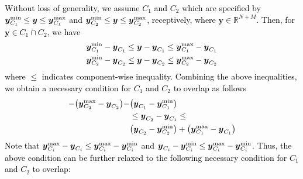 \documentclass[10pt,twocolumn,twoside]{IEEEtran}
\begin{document}
\begin{IEEEproof}
\textcolor{black}{Without loss of generality, we assume  $C_1$ and $C_2$ which are specified by ${\ensuremath{\boldsymbol{{y}}}}^{\rm min}_{C_1}\leq {\ensuremath{\boldsymbol{{y}}}}\leq {\ensuremath{\boldsymbol{{y}}}}^{\rm max}_{C_1}$ and ${\ensuremath{\boldsymbol{{y}}}}^{\rm min}_{C_2}\leq {\ensuremath{\boldsymbol{{y}}}}\leq {\ensuremath{\boldsymbol{{y}}}}^{\rm max}_{C_2}$, receptively, where ${\ensuremath{\boldsymbol{{y}}}}\in{\ensuremath{{\ensuremath{\mathbb{{R}}}}}}^{N+M}$. Then, for ${\ensuremath{\boldsymbol{{y}}}}\in C_1\cap C_2$, we have 
\begin{align}
{\ensuremath{\boldsymbol{{y}}}}^{\rm min}_{C_1}-{\ensuremath{\boldsymbol{{y}}}}_{C_1}&\leq {\ensuremath{\boldsymbol{{y}}}}-{\ensuremath{\boldsymbol{{y}}}}_{C_1}\leq {\ensuremath{\boldsymbol{{y}}}}^{\rm max}_{C_1}-{\ensuremath{\boldsymbol{{y}}}}_{C_1}\nonumber\\
{\ensuremath{\boldsymbol{{y}}}}^{\rm min}_{C_2}-{\ensuremath{\boldsymbol{{y}}}}_{C_2}&\leq {\ensuremath{\boldsymbol{{y}}}}-{\ensuremath{\boldsymbol{{y}}}}_{C_2}\leq {\ensuremath{\boldsymbol{{y}}}}^{\rm max}_{C_2}-{\ensuremath{\boldsymbol{{y}}}}_{C_2}\nonumber
\end{align}
where $\leq$ indicates component-wise inequality. Combining the above inequalities, we obtain a necessary condition for $C_1$ and $C_2$ to overlap as follows 
\begin{align}
-{\left({{\ensuremath{\boldsymbol{{y}}}}^{\rm max}_{C_2}-{\ensuremath{\boldsymbol{{y}}}}_{C_2}}\right)}-&{\left({{\ensuremath{\boldsymbol{{y}}}}_{C_1}-{\ensuremath{\boldsymbol{{y}}}}^{\rm min}_{C_1}}\right)}\nonumber\\
&\leq {\ensuremath{\boldsymbol{{y}}}}_{C_2}-{\ensuremath{\boldsymbol{{y}}}}_{C_1}\leq \nonumber\\
&{\left({{\ensuremath{\boldsymbol{{y}}}}_{C_2}-{\ensuremath{\boldsymbol{{y}}}}^{\rm min}_{C_2}}\right)}+{\left({{\ensuremath{\boldsymbol{{y}}}}^{\rm max}_{C_1}-{\ensuremath{\boldsymbol{{y}}}}_{C_1}}\right)}\nonumber
\end{align}
 Note that ${\ensuremath{\boldsymbol{{y}}}}^{\rm max}_{C_i}-{\ensuremath{\boldsymbol{{y}}}}_{C_i}\leq {\ensuremath{\boldsymbol{{y}}}}^{\rm max}_{C_i}-{\ensuremath{\boldsymbol{{y}}}}^{\rm min}_{C_i}$ and ${\ensuremath{\boldsymbol{{y}}}}_{C_i}-{\ensuremath{\boldsymbol{{y}}}}^{\rm min}_{C_i}\leq {\ensuremath{\boldsymbol{{y}}}}^{\rm max}_{C_i}-{\ensuremath{\boldsymbol{{y}}}}^{\rm min}_{C_i}$. Thus, the above condition can be further relaxed to the following necessary condition for $C_1$ and $C_2$ to overlap:
}
\end{IEEEproof}
\end{document}

